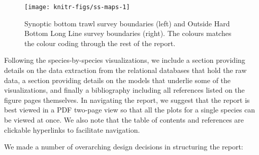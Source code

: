\documentclass[11pt]{book}\usepackage[]{graphicx}\usepackage[]{color}
\makeatletter
\newenvironment{kframe}{%
 \def\at@end@of@kframe{}%
 \ifinner\ifhmode%
  \def\at@end@of@kframe{\end{minipage}}%
  \begin{minipage}{\columnwidth}%
 \fi\fi%
 \def\FrameCommand##1{\hskip\@totalleftmargin \hskip-\fboxsep
 \colorbox{shadecolor}{##1}\hskip-\fboxsep
     \hskip-\linewidth \hskip-\@totalleftmargin \hskip\columnwidth}%
 \MakeFramed {\advance\hsize-\width
   \@totalleftmargin\z@ \linewidth\hsize
   \@setminipage}}%
 {\par\unskip\endMakeFramed%
 \at@end@of@kframe}
\newenvironment{knitrout}{}{} %
\makeatother
\begin{document}
\begin{knitrout}
\color{fgcolor}\begin{kframe}


{\ttfamily\noindent\itshape\color{messagecolor}{\#> Loading required package: Rcpp}}\end{kframe}\begin{figure}[htbp]

{\centering \texttt{[image: knitr-figs/ss-maps-1]} 

}

\caption[Synoptic bottom trawl survey boundaries (left) and Outside Hard Bottom Long Line survey boundaries (right)]{Synoptic bottom trawl survey boundaries (left) and Outside Hard Bottom Long Line survey boundaries (right). The colours matches the colour coding through the rest of the report.}\label{fig:ss-maps}
\end{figure}


\end{knitrout}

Following the species-by-species visualizations, we include a section providing
details on the data extraction from the relational databases that hold the raw
data, a section providing details on the models that underlie some of the
visualizations, and finally a bibliography including all references listed
on the figure pages themselves. In navigating the report, we suggest that the
report is best viewed in a PDF two-page view so that all the plots for a single
species can be viewed at once. We also note that the table of contents and
references are clickable hyperlinks to facilitate navigation.

We made a number of overarching design decisions in structuring the report:
\end{document}
